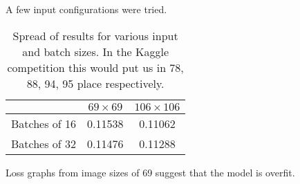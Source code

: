 A few input configurations were tried.

\begin{table}[]
    \centering
    \begin{tabular}{|r|c|c|}
        \hline
                      & $69 \times 69$ & $106 \times 106$ \\ \hline
        Batches of 16 & 0.11538 & 0.11062 \\ \hline
        Batches of 32 & 0.11476 & 0.11288 \\ \hline
    \end{tabular}
    \caption{Spread of results for various input and batch sizes. In the Kaggle competition this would put us in 78, 88, 94, 95 place respectively.}
    \label{tab:results1}
\end{table}

Loss graphs from image sizes of 69 suggest that the model is overfit.
